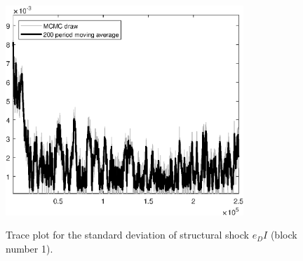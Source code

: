 \begin{figure}[H]
\centering
  \includegraphics[width=0.8\textwidth]{BRS_aggregate/graphs/TracePlot_SE_e_DI_blck_1}\\
    \caption{Trace plot for the standard deviation of structural shock ${e_DI}$ (block number 1).}
\end{figure}
